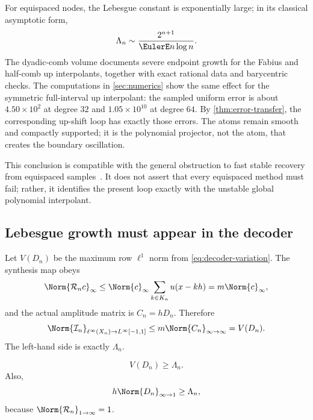 \documentclass[11pt,oneside]{article}
\numberwithin{equation}{section}
\theoremstyle{definition}
\theoremstyle{remark}
\newcommand{\Lag}{\mathcal I}
\newcommand{\Synth}{\mathcal R}
\begin{document}
For equispaced nodes, the Lebesgue constant is exponentially large; in its
classical asymptotic form,
\begin{equation}
 \Lambda_n\sim\frac{2^{n+1}}{\EulerE n\log n}.
 \label{eq:equispaced-Lebesgue}
\end{equation}
The dyadic-comb volume documents severe endpoint growth for the Fabius and
half-comb up interpolants, together with exact rational data and barycentric
checks.  The computations in \cref{sec:numerics} show the same effect for the
symmetric full-interval up interpolant: the sampled uniform error is about
$4.50\times10^2$ at degree $32$ and $1.05\times10^{10}$ at degree $64$.
By \cref{thm:error-transfer}, the corresponding up-shift loop has exactly
those errors.  The atoms remain smooth and compactly supported; it is the
polynomial projector, not the atom, that creates the boundary oscillation.

This conclusion is compatible with the general obstruction to fast stable
recovery from equispaced samples~\cite{PlatteTrefethenKuijlaars2011}.  It does
not assert that every equispaced method must fail; rather, it identifies the
present loop exactly with the unstable global polynomial interpolant.

\subsection{Lebesgue growth must appear in the decoder}

Let $V(D_n)$ be the maximum row $\ell^1$ norm from
\eqref{eq:decoder-variation}.  The synthesis map obeys
\begin{equation}
 \Norm{\Synth_nc}_\infty
 \le\Norm{c}_\infty\sum_{k\in K_n}u(x-kh)
 =m\Norm{c}_\infty,
 \label{eq:R-infty-bound}
\end{equation}
and the actual amplitude matrix is $C_n=hD_n$.  Therefore
\begin{equation}
 \Norm{\Lag_n}_{\ell^\infty(X_n)\to L^\infty[-1,1]}
 \le m\Norm{C_n}_{\infty\to\infty}
 =V(D_n).
 \label{eq:Lebesgue-decoder-bound}
\end{equation}
The left-hand side is exactly $\Lambda_n$.

\begin{proposition}
\label{prop:decoder-Lebesgue}
\begin{equation}
 \boxed{V(D_n)\ge\Lambda_n.}
 \label{eq:V-ge-Lambda}
\end{equation}
Also,
\begin{equation}
 h\Norm{D_n}_{\infty\to1}\ge\Lambda_n,
 \label{eq:D-infty-one}
\end{equation}
because $\Norm{\Synth_n}_{1\to\infty}=1$.
\end{proposition}
\end{document}
